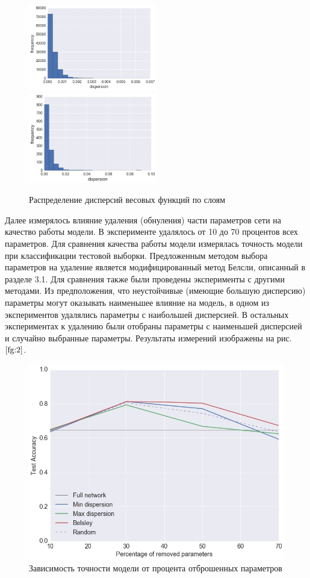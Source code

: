 \documentclass[12pt]{article}
\begin{document}
\begin{figure}[!h]
  \includegraphics[width=0.5\textwidth]{disp1.jpg}{}
  \includegraphics[width=0.5\textwidth]{disp2.jpg}{}
  \caption{Распределение дисперсий весовых функций по слоям}
  \label{fg:1}
\end{figure}

Далее измерялось влияние удаления (обнуления) части параметров сети на качество работы модели. В эксперименте удалялось от 10 до 70 процентов всех параметров. Для сравнения качества работы модели измерялась точность модели при классификации тестовой выборки. Предложенным методом выбора параметров на удаление является модифицированный метод Белсли, описанный в разделе 3.1. Для сравнения также были проведены эксперименты с другими методами. Из предположения, что неустойчивые (имеющие большую дисперсию) параметры могут оказывать наименьшее влияние на модель, в одном из экспериментов удалялись параметры с наибольшей дисперсией. В остальных экспериментах к удалению были отобраны параметры с наименьшей дисперсией и случайно выбранные параметры. Результаты измерений изображены на рис.~$\ref{fg:2}$.

\begin{figure}[!h]
  \includegraphics[width=1.0\textwidth]{graph.jpg}{}
  \caption{Зависимость точности модели от процента отброшенных параметров}
  \label{fg:2}
\end{figure}
\end{document}
